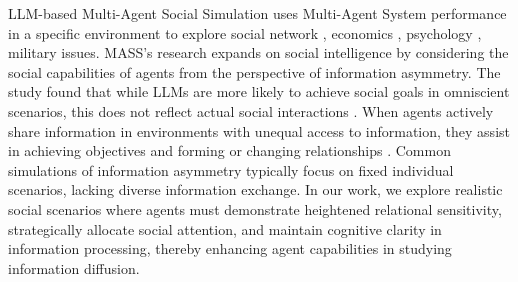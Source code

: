 LLM-based Multi-Agent Social Simulation \cite{b59,m56} uses Multi-Agent System performance in a specific environment to explore social network \cite{m56}, economics \cite{m59}, psychology \cite{m61}, military \cite{m60} issues. 
MASS's research expands on social intelligence by considering the social capabilities of agents \cite{b1} from the perspective of information asymmetry. 
The study found that while LLMs are more likely to achieve social goals in omniscient scenarios, this does not reflect actual social interactions \cite{b47}. 
When agents actively share information in environments with unequal access to information, they assist in achieving objectives \cite{b12} and forming or changing relationships \cite{b59}. 
Common simulations of information asymmetry typically focus on fixed individual scenarios, lacking diverse information exchange.
In our work, we explore realistic social scenarios where agents must demonstrate heightened relational sensitivity, strategically allocate social attention, and maintain cognitive clarity in information processing, thereby enhancing agent capabilities in studying information diffusion.
















